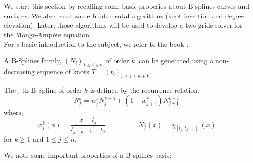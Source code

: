 
We start this section by recalling some basic properies about B-splines curves and surfaces. We also recall some fundamental algorithms (knot insertion and degree elevation). Later, those algorithms will be used to develop a two grids solver for the Monge-Amp\`ere equation.  
\\
For a basic introduction to the subject, we refer to the book \cite{piegl}.  

A B-Splines family, $(N_i)_{ 1 \leqslant i \leqslant n}$ of order $k$, can be generated using a non-decreasing sequence of knots $T=(t_i)_{1\leqslant i \leqslant n + k}$.
\begin{definition}
The j-th B-Spline of order $k$ is defined by the recurrence relation:
$$
N_j^k = w_j^k N_j^{k-1} + ( 1 - w_{j+1}^k ) N_{j+1}^{k-1}
$$
where,
$$
w_j^k (x) = \frac{x-t_j}{t_{j+k-1}-t_{j}} \hspace{2cm} N_j^1(x) = \chi_{ \left[ t_j, t_{j+1} \right[ }(x)
$$
for $k \geq 1$ and $1 \leq j \leq n$.
\end{definition}
%
We note some important properties of a B-splines basis:

